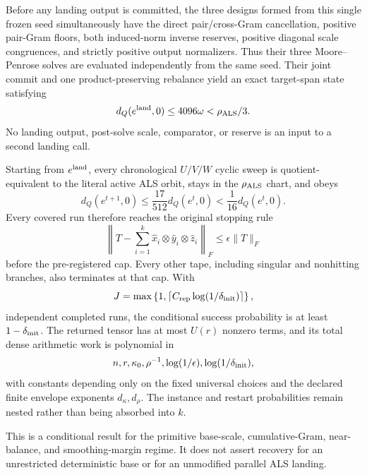 \begin{theorem}
Before any landing output is committed, the three designs formed from this
single frozen seed simultaneously have the direct pair/cross-Gram
cancellation, positive pair-Gram floors, both induced-norm inverse reserves,
positive diagonal scale congruences, and strictly positive output normalizers.
Thus their three Moore--Penrose solves are evaluated independently from the
same seed. Their joint commit and one product-preserving rebalance yield an
exact target-span state satisfying
\[
 d_Q(e^{\rm land},0)\le4096\omega<\rho_{\rm ALS}/3.
\]
No landing output, post-solve scale, comparator, or reserve is an input to a
second landing call.

Starting from $e^{\rm land}$, every chronological $U/V/W$ cyclic sweep is
quotient-equivalent to the literal active ALS orbit, stays in the
$\rho_{\rm ALS}$ chart, and obeys
\[
 d_Q(e^{t+1},0)\le\frac{17}{512}d_Q(e^t,0)<\frac1{16}d_Q(e^t,0).
\]
Every covered run therefore reaches the original stopping rule
\[
 \left\|T-\sum_{i=1}^k
 \widehat x_i\otimes\widehat y_i\otimes\widehat z_i\right\|_F
 \le\epsilon\|T\|_F
\]
before the pre-registered cap. Every other tape, including singular and
nonhitting branches, also terminates at that cap. With
\[
 J=\max\left\{1,
 \left\lceil C_{\rm rep}\log(1/\delta_{\rm init})\right\rceil\right\},
\]
independent completed runs, the conditional success probability is at least
$1-\delta_{\rm init}$. The returned tensor has at most $U(r)$ nonzero terms,
and its total dense arithmetic work is polynomial in
\[
 n,r,\kappa _0,\rho^{-1},\log(1/\epsilon),
 \log(1/\delta_{\rm init}),
\]
with constants depending only on the fixed universal choices and the declared
finite envelope exponents $d_\kappa,d_\rho$. The instance and restart
probabilities remain nested rather than being absorbed into $k$.
\end{theorem}

This is a conditional result for the primitive base-scale, cumulative-Gram,
near-balance, and smoothing-margin regime. It does not assert recovery for an
unrestricted deterministic base or for an unmodified parallel ALS landing.

